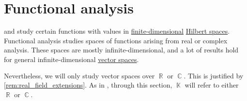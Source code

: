 \chapter{Functional analysis}\label{ch:functional_analysis}

 and  study certain functions with values in \hyperref[thm:vector_space_dimension]{finite-dimensional} \hyperref[def:hilbert_space]{Hilbert spaces}. Functional analysis studies spaces of functions arising from real or complex analysis. These spaces are mostly infinite-dimensional, and a lot of results hold for general infinite-dimensional \hyperref[def:vector_space]{vector spaces}.

Nevertheless, we will only study vector spaces over \hyperref[def:real_numbers]{\( \BbbR \)} or \hyperref[def:complex_numbers]{\( \BbbC \)}. This is justified by \cref{rem:real_field_extensions}. As in , through this section, \( \BbbK \) will refer to either \( \BbbR \) or \( \BbbC \).
